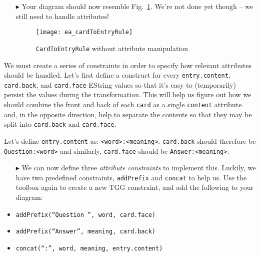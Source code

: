 \begin{enumerate}
\item[$\blacktriangleright$] Your diagram should now resemble Fig.~\ref{ea:cardtoentry_1}. We're not done yet though -- we still need to handle attributes!

\vspace{0.5cm}

  \begin{figure}[htbp]
  \begin{center}
    \texttt{[image: ea\_cardToEntryRule]}
    \caption{\texttt{CardToEntryRule} without attribute manipulation}
    \label{ea:cardtoentry_1}
  \end{center}
  \end{figure}

\end{enumerate}

We must create a series of constraints in order to specify how relevant attributes should be handled. Let's first define a construct for every
\texttt{entry\-.cont\-ent}, \texttt{card.back}, and \texttt{card.face} EString values so that it's easy to (temporarily) persist the values during the
transformation. This will help us figure out how we should combine the front and back of each \texttt{card} as a single \texttt{content} attribute and,
in the opposite direction, help to separate the contents so that they may be split into \texttt{card.back} and \texttt{card.face}.

\vspace{0.5cm}

Let's define \texttt{entry\-.cont\-ent} as: \texttt{<word>:<mean\-ing>}. \texttt{card\-.back} should therefore be \texttt{Quest\-ion:<word>} and
similarly, \texttt{card\-.face} should be \texttt{Ans\-wer:<mean\-ing>}. 

\begin{itemize}

\item[$\blacktriangleright$] We can now define three \emph{attribute constraints} to implement this. Luckily, we have two predefined constraints,
\texttt{addPrefix} and \texttt{concat} to help us. Use the toolbox again to create a new TGG constraint, and add the following to your diagram:

\vspace{0.5cm}

  \item \texttt{addPrefix(``Question '', word, card.face)}  
  
  \item \texttt{addPrefix(``Answer'', meaning, card.back)}
  
  \item \texttt{concat(``:'', word, meaning, entry.content)}

\end{itemize}

